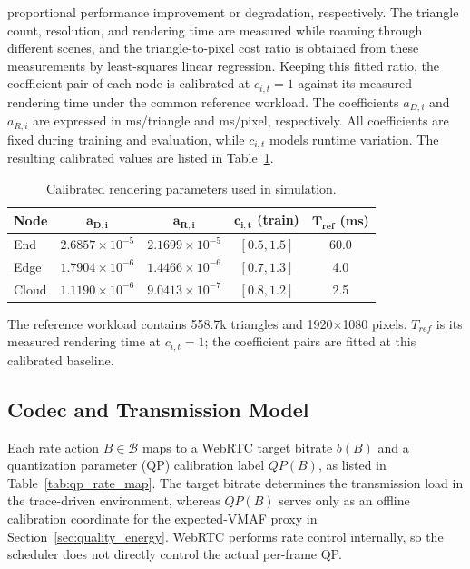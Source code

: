 \documentclass[acmsmall]{acmart}
\begin{document}
	proportional performance improvement or degradation, respectively. The
	triangle count, resolution, and rendering time are measured while roaming through different
	scenes, and the triangle-to-pixel cost ratio is obtained from these measurements by least-squares
	linear regression. Keeping this fitted ratio, the coefficient pair of each node is calibrated at
	$c_{i,t}=1$ against its measured rendering time under the common reference workload.
	The coefficients $a_{D,i}$ and $a_{R,i}$ are expressed in
	ms/triangle and ms/pixel, respectively. All
	coefficients are fixed during training and evaluation, while $c_{i,t}$ models runtime variation.
	The resulting calibrated values are listed in Table~\ref{tab:render_coefficients}.

	\begin{table}[htbp]
		\centering
		\caption{Calibrated rendering parameters used in simulation.}
		\label{tab:render_coefficients}
		\scriptsize
		\setlength{\tabcolsep}{3.2pt}
		\renewcommand{\arraystretch}{1.05}
		\begin{tabular}{lcccc}
			\toprule
			\textbf{Node} & $\boldsymbol{a_{D,i}}$ & $\boldsymbol{a_{R,i}}$ &
			$\boldsymbol{c_{i,t}}$ \textbf{(train)} & $\boldsymbol{T_{ref}}$ \textbf{(ms)} \\
			\midrule
			End   & $2.6857\!\times\!10^{-5}$ & $2.1699\!\times\!10^{-5}$ & $[0.5,1.5]$ & 60.0 \\
			Edge  & $1.7904\!\times\!10^{-6}$ & $1.4466\!\times\!10^{-6}$ & $[0.7,1.3]$ & 4.0 \\
			Cloud & $1.1190\!\times\!10^{-6}$ & $9.0413\!\times\!10^{-7}$ & $[0.8,1.2]$ & 2.5 \\
			\bottomrule
		\end{tabular}
		\par\smallskip
		\raggedright\scriptsize The reference workload contains 558.7k triangles and
		1920$\times$1080 pixels. $T_{ref}$ is its measured rendering time at $c_{i,t}=1$;
		the coefficient pairs are fitted at this calibrated baseline.\par
	\end{table}

	\subsection{Codec and Transmission Model}
	\label{sec:codec_transmission}

	Each rate action $B\in\mathcal{B}$ maps to a WebRTC target bitrate $b(B)$ and a quantization parameter (QP) calibration label $QP(B)$, as listed in Table~\ref{tab:qp_rate_map}. The target bitrate determines the transmission load in the trace-driven environment, whereas $QP(B)$ serves only as an offline calibration coordinate for the expected-VMAF proxy in Section~\ref{sec:quality_energy}. WebRTC performs rate control internally, so the scheduler does not directly control the actual per-frame QP.
\end{document}
